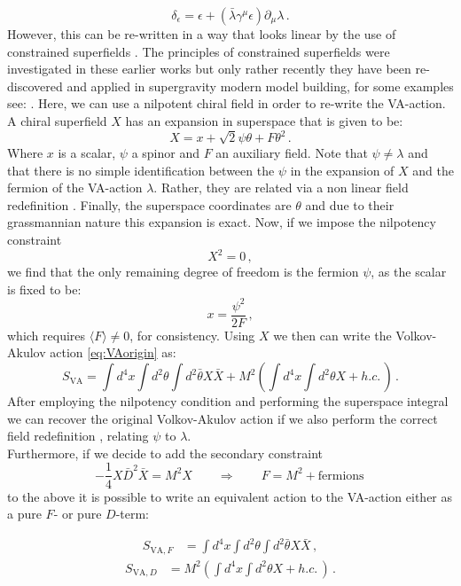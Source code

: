 \documentclass[a4paper,12pt,twoside,openright]{report}
\newcommand{\be}{\begin{equation}}
\newcommand{\ee}{\end{equation}}
\newcommand{\bea}{\begin{equation}\begin{aligned}}
\newcommand{\eea}{\end{aligned}\end{equation}}
\begin{document}
\be 
\delta_\epsilon = \epsilon +  \left(\bar{\lambda} \gamma^\mu \epsilon\right) \partial_\mu \lambda\,.
\ee
However, this can be re-written in a way that looks linear by the use of constrained superfields \cite{Rocek:1978nb,Lindstrom:1979kq,Samuel:1982uh,Komargodski:2009rz}. The principles of constrained superfields were investigated in these earlier works but only rather recently they have been re-discovered and applied in supergravity modern model building, for some examples see: \cite{Kallosh:2016aep,Vercnocke:2016fbt,GarciadelMoral:2017vnz,Kallosh:2018nrk,Kallosh:2019apq,Cribiori:2019hod,Cribiori:2019bfx,Kallosh:2019zgd,Cribiori:2020zoh,Cribiori:2020bgt}. Here, we can use a nilpotent chiral field in order to re-write the VA-action. A chiral superfield $X$ has an expansion in superspace that is given to be:
\be 
X = x + \sqrt{2} \psi \theta + F \theta^2\,.
\ee
Where $x$ is a scalar, $\psi$ a spinor and $F$ an auxiliary field. Note that $\psi \neq \lambda$ and that there is no simple identification between the $\psi$ in the expansion of $X$ and the fermion of the VA-action $\lambda$. Rather, they are related via a non linear field redefinition \cite{Bergshoeff:2015jxa}. Finally, the superspace coordinates are $\theta$ and due to their grassmannian nature this expansion is exact. Now, if we impose the nilpotency constraint
\be 
X^2 = 0\,,
\ee
we find that the only remaining degree of freedom is the fermion $\psi$, as the scalar is fixed to be:
\be 
x = \frac{\psi^2}{2 F}\,,
\ee 
which requires $\langle F \rangle \neq 0$, for consistency. Using $X$ we then can write the Volkov-Akulov action \eqref{eq:VAorigin} as:
\be 
S_{\text{VA}} = \int d^4x \int d^2 \theta \int d^2 \bar{\theta} X \bar{X} + M^2 \left( \int d^4 x \int d^2\theta X + h.c.\,\right)\,.
\ee
After employing the nilpotency condition and performing the superspace integral we can recover the original Volkov-Akulov action if we also perform the correct field redefinition \cite{Bergshoeff:2015jxa}, relating $\psi$ to $\lambda$.\\
Furthermore, if we decide to add the secondary constraint 
\be 
-\frac{1}{4} X \bar{D}^2 \bar{X} = M^2 X \qquad \Rightarrow \qquad F = M^2 + \text{fermions}\,
\label{eq:secconst}
\ee
to the above it is possible to write an equivalent action to the VA-action either as a pure $F$- or pure $D$-term:

\bea 
S_{\text{VA},F} &= \int d^4x \int d^2 \theta \int d^2 \bar{\theta} X \bar{X}\,,
\eea
\bea
S_{\text{VA},D} &=  M^2 \left( \int d^4 x \int d^2\theta X + h.c.\,\right)\,.
\eea
\end{document}
